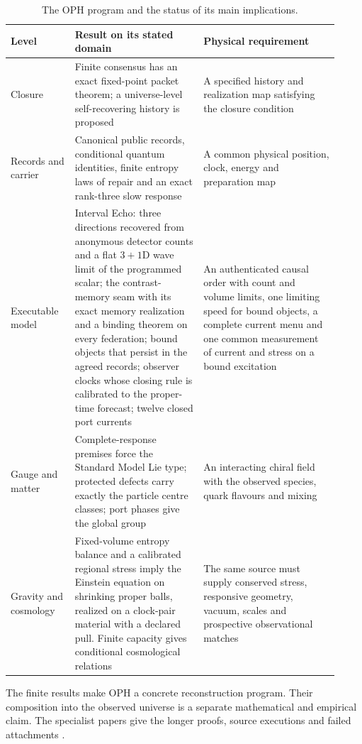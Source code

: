 \documentclass[11pt]{article}
\theoremstyle{definition}
\theoremstyle{remark}
\begin{document}
\begin{table}[htbp]
\centering\small
\caption{The OPH program and the status of its main implications.}
\label{tab:program-status}
\begin{tabular}{@{}L{0.18\linewidth}L{0.36\linewidth}L{0.38\linewidth}@{}}
\toprule
\textbf{Level} & \textbf{Result on its stated domain} & \textbf{Physical requirement}\\
\midrule
Closure & Finite consensus has an exact fixed-point packet theorem; a
universe-level self-recovering history is proposed & A specified history
and realization map satisfying the closure condition\\
Records and carrier & Canonical public records, conditional quantum
identities, finite entropy laws of repair and an exact rank-three slow
response & A common physical position, clock, energy and preparation map\\
Executable model & Interval Echo: three directions recovered from
anonymous detector counts and a flat $3{+}1$D wave limit of the programmed
scalar; the contrast-memory seam with its exact memory realization and a
binding theorem on every federation; bound objects that persist in the
agreed records; observer clocks whose closing rule is calibrated to the
proper-time forecast; twelve closed port currents & An
authenticated causal order with count and volume limits, one limiting speed
for bound objects, a complete current menu and one common measurement of
current and stress on a bound excitation\\
Gauge and matter & Complete-response premises force the Standard Model
Lie type; protected defects carry exactly the particle centre classes; port
phases give the global group & An interacting chiral field
with the observed species, quark flavours and mixing\\
Gravity and cosmology & Fixed-volume entropy balance and a calibrated
regional stress imply the Einstein equation on shrinking proper balls,
realized on a clock-pair material with a declared pull. Finite capacity
gives conditional
cosmological relations & The same source must supply conserved stress, responsive
geometry, vacuum, scales and prospective observational matches\\
\bottomrule
\end{tabular}
\end{table}

The finite results make OPH a concrete reconstruction program. Their
composition into the observed universe is a separate mathematical and
empirical claim. The specialist papers give the longer proofs, source
executions and failed attachments
\cite{ophparticles,ophGauge,ophEinstein,ophspine}.
\end{document}
